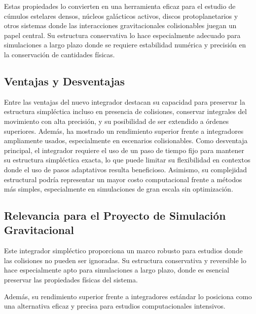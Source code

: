 Estas propiedades lo convierten en una herramienta eficaz para el estudio de cúmulos estelares densos, núcleos galácticos activos, discos protoplanetarios y otros sistemas donde las interacciones gravitacionales colisionables juegan un papel central. Su estructura conservativa lo hace especialmente adecuado para simulaciones a largo plazo donde se requiere estabilidad numérica y precisión en la conservación de cantidades físicas.

\subsection{Ventajas y Desventajas}

Entre las ventajas del nuevo integrador destacan su capacidad para preservar la estructura simpléctica incluso en presencia de colisiones, conservar integrales del movimiento con alta precisión, y su posibilidad de ser extendido a órdenes superiores. Además, ha mostrado un rendimiento superior frente a integradores ampliamente usados, especialmente en escenarios colisionables. Como desventaja principal, el integrador requiere el uso de un paso de tiempo fijo para mantener su estructura simpléctica exacta, lo que puede limitar su flexibilidad en contextos donde el uso de pasos adaptativos resulta beneficioso. Asimismo, su complejidad estructural podría representar un mayor costo computacional frente a métodos más simples, especialmente en simulaciones de gran escala sin optimización.

\subsection{Relevancia para el Proyecto de Simulación Gravitacional}

Este integrador simpléctico proporciona un marco robusto para estudios donde las colisiones no pueden ser ignoradas. Su estructura conservativa y reversible lo hace especialmente apto para simulaciones a largo plazo, donde es esencial preservar las propiedades físicas del sistema.

Además, su rendimiento superior frente a integradores estándar lo posiciona como una alternativa eficaz y precisa para estudios computacionales intensivos.